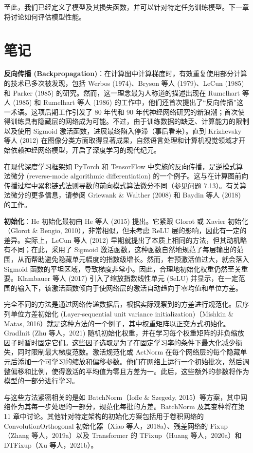 \documentclass[lang=cn,newtx,10pt,scheme=chinese]{elegantbook}
\begin{document}
至此，我们已经定义了模型及其损失函数，并可以针对特定任务训练模型。下一章将讨论如何评估模型性能。
\section{笔记}
\textbf{反向传播 (Backpropagation)}：在计算图中计算梯度时，有效重复使用部分计算的技术已多次被发现，包括 Werbos (1974)、Bryson 等人 (1979)、LeCun (1985) 和 Parker (1985) 的研究。然而，这一理念最为人称道的描述出现在 Rumelhart 等人 (1985) 和 Rumelhart 等人 (1986) 的工作中，他们还首次提出了“反向传播”这一术语。这项后期工作引发了 80 年代和 90 年代神经网络研究的新浪潮；首次使得训练具有隐藏层的网络成为可能。不过，由于训练数据的缺乏、计算能力的限制以及使用 Sigmoid 激活函数，进展最终陷入停滞（事后看来）。直到 Krizhevsky 等人 (2012) 在图像分类方面取得显著成果，自然语言处理和计算机视觉领域才开始依赖神经网络模型，开启了深度学习的现代纪元。

在现代深度学习框架如 PyTorch 和 TensorFlow 中实施的反向传播，是逆模式算法微分 (reverse-mode algorithmic differentiation) 的一个例子。这与在计算图前向传播过程中累积链式法则导数的前向模式算法微分不同（参见问题 7.13）。有关算法微分的更多信息，请参阅 Griewank \& Walther (2008) 和 Baydin 等人 (2018) 的工作。

\textbf{初始化}：He 初始化最初由 He 等人 (2015) 提出。它紧跟 Glorot 或 Xavier 初始化（Glorot \& Bengio, 2010），非常相似，但未考虑 ReLU 层的影响，因此有一定的差异。实际上，LeCun 等人 (2012) 早期就提出了本质上相同的方法，但其动机略有不同；在此，采用了 Sigmoid 激活函数，这种函数自然地规范了每层输出的范围，从而帮助避免隐藏单元幅度的指数级增长。然而，若预激活值过大，就会落入 Sigmoid 函数的平坦区域，导致梯度非常小。因此，合理地初始化权重仍然至关重要。Klambauer 等人 (2017) 引入了缩放指数线性单元 (SeLU) 并显示，在一定范围的输入下，该激活函数倾向于使网络层的激活自动趋向于零均值和单位方差。

完全不同的方法是通过网络传递数据后，根据实际观察到的方差进行规范化。层序列单位方差初始化 (Layer-sequential unit variance initialization)（Mishkin \& Matas, 2016）就是这种方法的一个例子，其中权重矩阵以正交方式初始化。GradInit (Zhu 等人，2021) 随机初始化权重，并在学习每个权重矩阵的非负缩放因子时暂时固定它们。这些因子选取是为了在固定学习率的条件下最大化减少损失，同时限制最大梯度范数。激活规范化或 ActNorm 在每个网络层的每个隐藏单元后添加一个可学习的缩放和偏移参数。他们在网络上运行一个初始批次，然后调整偏移和比例，使得激活的平均值为零且方差为一。此后，这些额外的参数将作为模型的一部分进行学习。

与这些方法紧密相关的是如 BatchNorm（Ioffe \& Szegedy, 2015）等方案，其中网络作为其每一步处理的一部分，规范化每批的方差。BatchNorm 及其变种将在第 11 章中讨论。其他针对特定架构的初始化方案包括用于卷积网络的 ConvolutionOrthogonal 初始化器（Xiao 等人，2018a）、残差网络的 Fixup（Zhang 等人，2019a）以及 Transformer 的 TFixup（Huang 等人，2020a）和 DTFixup（Xu 等人，2021b）。
\end{document}
